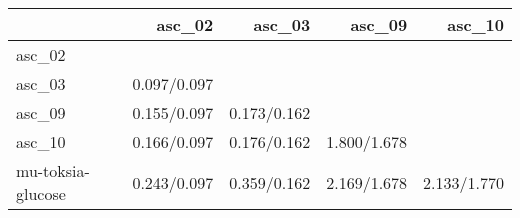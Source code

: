 \begin{tabular}{lrrrr}
\toprule
 & asc_02 & asc_03 & asc_09 & asc_10 \\
\midrule
asc_02 &  &  &  &  \\
asc_03 & 0.097/0.097 &  &  &  \\
asc_09 & 0.155/0.097 & 0.173/0.162 &  &  \\
asc_10 & 0.166/0.097 & 0.176/0.162 & 1.800/1.678 &  \\
mu-toksia-glucose & 0.243/0.097 & 0.359/0.162 & 2.169/1.678 & 2.133/1.770 \\
\bottomrule
\end{tabular}
